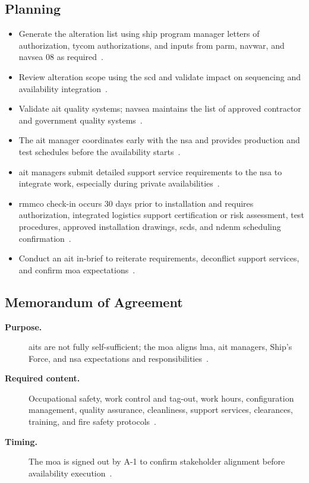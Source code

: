 \documentclass[../main.tex]{subfiles}
\begin{document}
\subsection{Planning}
\begin{itemize}
  \item Generate the alteration list using ship program manager letters of authorization, \ac{tycom} authorizations, and inputs from \ac{parm}, \ac{navwar}, and \ac{navsea} 08 as required~\autocite{edo-4-1-4-ait-fundamentals-2025}.
  \item Review alteration scope using the \ac{scd} and validate impact on sequencing and availability integration~\autocite{edo-4-1-4-ait-fundamentals-2025}.
  \item Validate \ac{ait} quality systems; \ac{navsea} maintains the list of approved contractor and government quality systems~\autocite{edo-4-1-4-ait-fundamentals-2025}.
  \item The \ac{ait} manager coordinates early with the \ac{nsa} and provides production and test schedules before the availability starts~\autocite{edo-4-1-4-ait-fundamentals-2025,TS9090-310}.
  \item \ac{ait} managers submit detailed support service requirements to the \ac{nsa} to integrate work, especially during private availabilities~\autocite{edo-4-1-4-ait-fundamentals-2025,TS9090-310}.
  \item \ac{rmmco} check-in occurs 30 days prior to installation and requires authorization, integrated logistics support certification or risk assessment, test procedures, approved installation drawings, \acp{scd}, and \ac{ndenm} scheduling confirmation~\autocite{edo-4-1-4-ait-fundamentals-2025,JFMM-VolVI-RevD-Chg5-2025,TS9090-310}.
  \item Conduct an \ac{ait} in-brief to reiterate requirements, deconflict support services, and confirm \ac{moa} expectations~\autocite{edo-4-1-4-ait-fundamentals-2025}.
\end{itemize}

\subsection{Memorandum of Agreement}
\begin{description}
  \item[\textbf{Purpose.}] \acp{ait} are not fully self-sufficient; the \ac{moa} aligns \ac{lma}, \ac{ait} managers, Ship's Force, and \ac{nsa} expectations and responsibilities~\autocite{edo-4-1-4-ait-fundamentals-2025}.
  \item[\textbf{Required content.}] Occupational safety, work control and tag-out, work hours, configuration management, quality assurance, cleanliness, support services, clearances, training, and fire safety protocols~\autocite{edo-4-1-4-ait-fundamentals-2025}.
  \item[\textbf{Timing.}] The \ac{moa} is signed out by A-1 to confirm stakeholder alignment before availability execution~\autocite{edo-4-1-4-ait-fundamentals-2025}.
\end{description}
\end{document}
